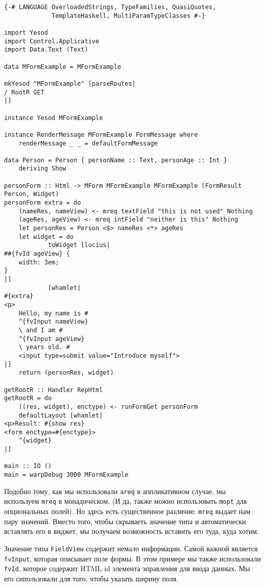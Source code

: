 \begin{lstlisting}
{-# LANGUAGE OverloadedStrings, TypeFamilies, QuasiQuotes,
             TemplateHaskell, MultiParamTypeClasses #-}

import Yesod
import Control.Applicative
import Data.Text (Text)

data MFormExample = MFormExample

mkYesod "MFormExample" [parseRoutes|
/ RootR GET
|]

instance Yesod MFormExample

instance RenderMessage MFormExample FormMessage where
    renderMessage _ _ = defaultFormMessage

data Person = Person { personName :: Text, personAge :: Int }
    deriving Show

personForm :: Html -> MForm MFormExample MFormExample (FormResult Person, Widget)
personForm extra = do
    (nameRes, nameView) <- mreq textField "this is not used" Nothing
    (ageRes, ageView) <- mreq intField "neither is this" Nothing
    let personRes = Person <$> nameRes <*> ageRes
    let widget = do
            toWidget [lucius|
##{fvId ageView} {
    width: 3em;
}
|]
            [whamlet|
#{extra}
<p>
    Hello, my name is #
    ^{fvInput nameView}
    \ and I am #
    ^{fvInput ageView}
    \ years old. #
    <input type=submit value="Introduce myself">
|]
    return (personRes, widget)

getRootR :: Handler RepHtml
getRootR = do
    ((res, widget), enctype) <- runFormGet personForm
    defaultLayout [whamlet|
<p>Result: #{show res}
<form enctype=#{enctype}>
    ^{widget}
|]

main :: IO ()
main = warpDebug 3000 MFormExample
\end{lstlisting}
Подобно тому, как мы использовали \lstinline'areq' в аппликативном случае, мы используем 
\lstinline'mreq' в монадическом. (И да, также можно использовать \lstinline'mopt' для опциональных полей).
Но здесь есть существенное различие: \lstinline'mreq' выдает нам пару значений. 
Вместо того, чтобы скрываеть значение типа 
и автоматически вставлять его в виджет, мы получаем возможность вставить его 
туда, куда хотим.

Значение типа \lstinline'FieldView' содержит немало информации. Самой важной является 
\lstinline'fvInput', которая описывает поле формы. В этом примере мы также использовали
\lstinline'fvId', которое содержит HTML id элемента эправления для ввода данных. Мы
его сипользовали для того, чтобы указать ширину поля.

